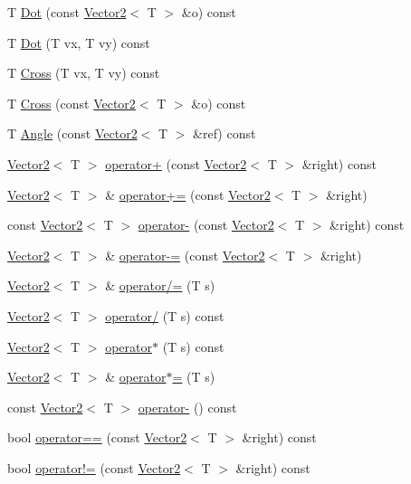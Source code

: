 \begin{DoxyCompactItemize}
\item 
T \hyperlink{classastu_1_1Vector2_a44f449c9f23b8e5aa2739c3a50b57ceb}{Dot} (const \hyperlink{classastu_1_1Vector2}{Vector2}$<$ T $>$ \&o) const
\item 
T \hyperlink{classastu_1_1Vector2_a0fb863e03982e1583a0945873caf92d7}{Dot} (T vx, T vy) const
\item 
T \hyperlink{classastu_1_1Vector2_ad7245590bd3a503f0c388cad9008789b}{Cross} (T vx, T vy) const
\item 
T \hyperlink{classastu_1_1Vector2_ab39f342813a6f5f21a533a4345e1336c}{Cross} (const \hyperlink{classastu_1_1Vector2}{Vector2}$<$ T $>$ \&o) const
\item 
T \hyperlink{classastu_1_1Vector2_af44c9648648cb03637f520669e9a2d8e}{Angle} (const \hyperlink{classastu_1_1Vector2}{Vector2}$<$ T $>$ \&ref) const
\item 
\hyperlink{classastu_1_1Vector2}{Vector2}$<$ T $>$ \hyperlink{classastu_1_1Vector2_a1ebf3c3f9ef6c8e07f6ea2327a630fca}{operator+} (const \hyperlink{classastu_1_1Vector2}{Vector2}$<$ T $>$ \&right) const
\item 
\hyperlink{classastu_1_1Vector2}{Vector2}$<$ T $>$ \& \hyperlink{classastu_1_1Vector2_a285af566f7b2e4a218932094ab9a70f8}{operator+=} (const \hyperlink{classastu_1_1Vector2}{Vector2}$<$ T $>$ \&right)
\item 
const \hyperlink{classastu_1_1Vector2}{Vector2}$<$ T $>$ \hyperlink{classastu_1_1Vector2_a694ff874fcdb2118ed665a7cb28978e9}{operator-\/} (const \hyperlink{classastu_1_1Vector2}{Vector2}$<$ T $>$ \&right) const
\item 
\hyperlink{classastu_1_1Vector2}{Vector2}$<$ T $>$ \& \hyperlink{classastu_1_1Vector2_a7022d1b830ee06d272a05d7d52c93a53}{operator-\/=} (const \hyperlink{classastu_1_1Vector2}{Vector2}$<$ T $>$ \&right)
\item 
\hyperlink{classastu_1_1Vector2}{Vector2}$<$ T $>$ \& \hyperlink{classastu_1_1Vector2_a9f9362218a0d011032324cbc7a9a85a1}{operator/=} (T s)
\item 
\hyperlink{classastu_1_1Vector2}{Vector2}$<$ T $>$ \hyperlink{classastu_1_1Vector2_af2852a5bb5295f1a510e507bc554863d}{operator/} (T s) const
\item 
\hyperlink{classastu_1_1Vector2}{Vector2}$<$ T $>$ \hyperlink{classastu_1_1Vector2_aa9cd4d74e0174cb0995613f989e42f12}{operator$\ast$} (T s) const
\item 
\hyperlink{classastu_1_1Vector2}{Vector2}$<$ T $>$ \& \hyperlink{classastu_1_1Vector2_a3a4e11dd85fbd0e1cda4e8b38b9aea6a}{operator$\ast$=} (T s)
\item 
const \hyperlink{classastu_1_1Vector2}{Vector2}$<$ T $>$ \hyperlink{classastu_1_1Vector2_aaa65baf8ffd013a0401c4875d91337a4}{operator-\/} () const
\item 
bool \hyperlink{classastu_1_1Vector2_ada7f1d693330e7671cb1f951d8011c08}{operator==} (const \hyperlink{classastu_1_1Vector2}{Vector2}$<$ T $>$ \&right) const
\item 
bool \hyperlink{classastu_1_1Vector2_a01b57021e1b027997ecefb3c9b3595d9}{operator!=} (const \hyperlink{classastu_1_1Vector2}{Vector2}$<$ T $>$ \&right) const
\end{DoxyCompactItemize}
